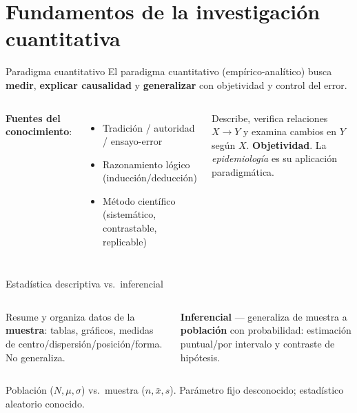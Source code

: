 \documentclass[aspectratio=169,8pt]{beamer}
\begin{document}
\section{Fundamentos de la investigaci\'on cuantitativa}

\begin{frame}{Paradigma cuantitativo}
  \small El paradigma cuantitativo (emp\'irico-anal\'itico) busca \textbf{medir}, \textbf{explicar causalidad} y \textbf{generalizar} con objetividad y control del error.
  \vspace{0.3em}
  \begin{columns}[T,onlytextwidth]
      \textbf{Fuentes del conocimiento}:
      \begin{itemize}
        \item Tradici\'on / autoridad / ensayo-error
        \item Razonamiento l\'ogico (inducci\'on/deducci\'on)
        \item M\'etodo cient\'ifico (sistem\'atico, contrastable, replicable)
      \end{itemize}
      \begin{tcolorbox}[formulabox,title=Investigaci\'on cuantitativa]
        \footnotesize
        Describe, verifica relaciones $X\to Y$ y examina cambios en $Y$ seg\'un $X$. \textbf{Objetividad}. La \emph{epidemiolog\'ia} es su aplicaci\'on paradigm\'atica.
      \end{tcolorbox}
    \end{columns}
\end{frame}

\begin{frame}{Estad\'istica descriptiva vs.\ inferencial}
  \small
  \begin{columns}[T,onlytextwidth]
      \begin{tcolorbox}[formulabox,title=Descriptiva]
        \footnotesize Resume y organiza datos de la \textbf{muestra}: tablas, gr\'aficos, medidas de centro/dispersi\'on/posici\'on/forma. No generaliza.
      \end{tcolorbox}
      \begin{tcolorbox}[tealbox]
        \footnotesize\textbf{Inferencial} --- generaliza de muestra a \textbf{poblaci\'on} con probabilidad: estimaci\'on puntual/por intervalo y contraste de hip\'otesis.
      \end{tcolorbox}
  \end{columns}
  \vspace{0.4em}
  {\scriptsize\color{neutral}Poblaci\'on ($N,\mu,\sigma$) vs.\ muestra ($n,\bar x,s$). Par\'ametro fijo desconocido; estad\'istico aleatorio conocido.}
\end{frame}
\end{document}
